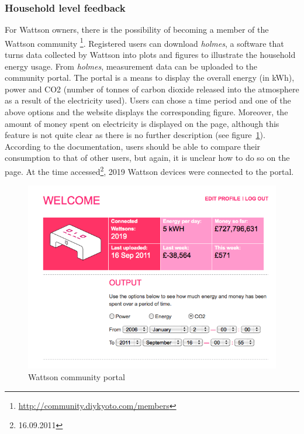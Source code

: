 \subsubsection{Household level feedback}\label{sec:household_level_feedback}
For Wattson owners, there is the possibility of becoming a member of the Wattson community \footnote{\url{http://community.diykyoto.com/members}}. Registered users can download \textit{holmes}, a software that turns data collected by Wattson into plots and figures to illustrate the household energy usage. From \textit{holmes}, measurement data can be uploaded to the community portal. The portal is a means to display the overall energy (in kWh), power and CO2 (number of tonnes of carbon dioxide released into the atmosphere as a result of the electricity used). Users can chose a time period and one of the above options and the website displays the corresponding figure. Moreover, the amount of money spent on electricity is displayed on the page, although this feature is not quite clear as there is no further description (see figure~\ref{wattson_community}). According to the documentation, users should be able to compare their consumption to that of other users, but again, it is unclear how to do so on the page. At the time accessed\footnote{16.09.2011}, 2019 Wattson devices were connected to the portal. 
\begin{figure}[htbp]
\begin{center}
\includegraphics[width=12cm]{Images/wattson_community.png}
\caption{Wattson community portal}
\label{wattson_community}
\end{center}
\end{figure}

